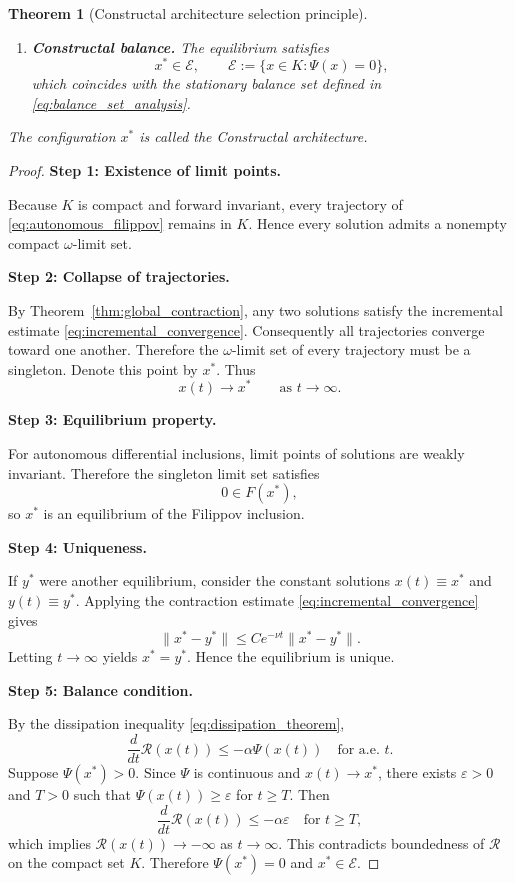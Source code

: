 \documentclass[12pt]{article}
\theoremstyle{plain}
\newtheorem{theorem}{Theorem}[section]
\theoremstyle{definition}
\theoremstyle{remark}
\begin{document}
\begin{theorem}[Constructal architecture selection principle]
\begin{enumerate}[label=(\alph*),leftmargin=2.2em]
\item \textbf{Constructal balance.}
      The equilibrium satisfies
      \begin{equation}
      x^\ast\in\mathcal E,
      \qquad
      \mathcal E :=
      \{x\in K:\Psi(x)=0\},
      \label{eq:constructal_balance}
      \end{equation}
      which coincides with the stationary balance set defined in
      \eqref{eq:balance_set_analysis}.

\end{enumerate}

The configuration $x^\ast$ is called the
\emph{Constructal architecture}.
\end{theorem}

\begin{proof}

\textbf{Step 1: Existence of limit points.}

Because $K$ is compact and forward invariant,
every trajectory of \eqref{eq:autonomous_filippov}
remains in $K$.
Hence every solution admits a nonempty compact
$\omega$-limit set.

\textbf{Step 2: Collapse of trajectories.}

By Theorem~\ref{thm:global_contraction},
any two solutions satisfy the incremental estimate
\eqref{eq:incremental_convergence}.
Consequently all trajectories converge toward one another.
Therefore the $\omega$-limit set of every trajectory must be a
singleton.
Denote this point by $x^\ast$.
Thus
\[
x(t)\to x^\ast
\qquad \text{as } t\to\infty .
\]

\textbf{Step 3: Equilibrium property.}

For autonomous differential inclusions,
limit points of solutions are weakly invariant.
Therefore the singleton limit set satisfies
\[
0\in F(x^\ast),
\]
so $x^\ast$ is an equilibrium of the Filippov inclusion.

\textbf{Step 4: Uniqueness.}

If $y^\ast$ were another equilibrium,
consider the constant solutions
$x(t)\equiv x^\ast$ and $y(t)\equiv y^\ast$.
Applying the contraction estimate
\eqref{eq:incremental_convergence}
gives
\[
\|x^\ast-y^\ast\|
\le
C e^{-\nu t}\|x^\ast-y^\ast\|.
\]
Letting $t\to\infty$ yields $x^\ast=y^\ast$.
Hence the equilibrium is unique.

\textbf{Step 5: Balance condition.}

By the dissipation inequality
\eqref{eq:dissipation_theorem},
\[
\frac{d}{dt}\mathcal R(x(t))
\le -\alpha\Psi(x(t))
\quad \text{for a.e. } t .
\]
Suppose $\Psi(x^\ast)>0$.
Since $\Psi$ is continuous and $x(t)\to x^\ast$,
there exists $\varepsilon>0$ and $T>0$ such that
$\Psi(x(t))\ge\varepsilon$ for $t\ge T$.
Then
\[
\frac{d}{dt}\mathcal R(x(t))
\le -\alpha\varepsilon
\quad \text{for } t\ge T,
\]
which implies $\mathcal R(x(t))\to -\infty$ as $t\to\infty$.
This contradicts boundedness of $\mathcal R$ on the compact set $K$.
Therefore $\Psi(x^\ast)=0$ and $x^\ast\in\mathcal E$.

\end{proof}
\end{document}
